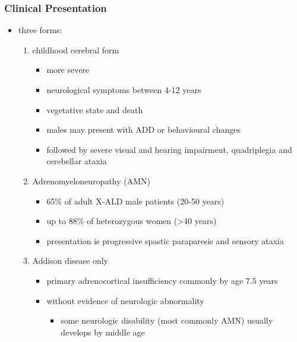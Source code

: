 \documentclass[12pt]{scrartcl}
\begin{document}
\subsubsection{Clinical Presentation}
\label{sec:org30587bd}
\begin{itemize}
\item three forms:
\begin{enumerate}
\item childhood cerebral form
\begin{itemize}
\item more severe
\item neurological symptoms between 4-12 years
\item vegetative state and death
\item males may present with ADD or behavioural changes
\item followed by severe visual and hearing impairment, quadriplegia and
cerebellar ataxia
\end{itemize}
\item Adrenomyeloneuropathy (AMN) 
\begin{itemize}
\item 65\% of adult X-ALD male patients (20-50 years)
\item up to 88\% of heterozygous women (\textgreater{}40 years)
\item presentation is progressive spastic paraparesis and sensory ataxia
\end{itemize}
\item Addison disease only
\begin{itemize}
\item primary adrenocortical insufficiency commonly by age 7.5 years
\item without evidence of neurologic abnormality
\begin{itemize}
\item some neurologic disability (most commonly AMN) usually
develops by middle age
\end{itemize}
\end{itemize}
\end{enumerate}
\end{itemize}
\end{document}
